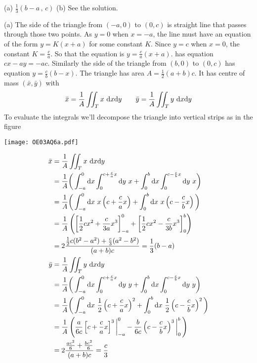 %

\begin{answer}
(a) $\frac{1}{3}(b-a\,,\,c)$\qquad
(b) See the solution.
\end{answer}

\begin{solution}
(a) The side of the triangle from $(-a,0)$ to $(0,c)$ is straight line that passes through those two points. As $y=0$ when $x=-a$, the line must have 
an equation of the form $y=K(x+a)$ for some constant $K$. Since $y=c$ when
$x=0$, the constant $K=\frac{c}{a}$. So that the equation is 
$y=\frac{c}{a}(x+a)$.
has equation $cx-ay=-ac$. Similarly the side of the triangle from 
$(b,0)$ to $(0,c)$ has equation $y=\frac{c}{b}(b-x)$. 
The triangle has area $A=\frac{1}{2}(a+b)c$. It has centre
of mass $(\bar x,\bar y)$ with
\begin{align*}
\bar x=\frac{1}{A}\iint_T x\ \mathrm{d}x\mathrm{d}y\qquad
\bar y=\frac{1}{A}\iint_T y\ \mathrm{d}x\mathrm{d}y
\end{align*}
To evaluate the integrals we'll decompose the triangle into vertical strips
as in the figure
\begin{center}
     \texttt{[image: OE03AQ6a.pdf]}
\end{center}
\begin{align*}
\bar x&=\frac{1}{A}\dblInt_T x\ \dee{x}\dee{y} \\
&=\frac{1}{A}\bigg(\int_{-a}^0 \dee{x}\int_0^{c+{c\over a}x}\dee{y}\ x
                   +\int_0^b \dee{x}\int_0^{c-{c\over b}x}\dee{y}\ x\bigg)\\
&=\frac{1}{A}\bigg(\int_{-a}^0 \dee{x}\ x\left(c+\frac{c}{a}x\right)
                   +\int_0^b \dee{x}\ x\left(c-\frac{c}{b}x\right)\bigg)\\
&=\frac{1}{A}\left(\left[\frac{1}{2} cx^2+\frac{c}{3a}x^3\right]_{-a}^0 
                   +\left[\frac{1}{2} cx^2-\frac{c}{3b}x^3\right]_0^b\right) \\
&=2\frac{\frac{1}{2} c(b^2-a^2)+\frac{c}{3}(a^2-b^2)}{(a+b)c}
=\frac{1}{3}(b-a)\\
\bar y&=\frac{1}{A}\dblInt_T y\ \dee{x}\dee{y} \\
&=\frac{1}{A}\bigg(\int_{-a}^0 \dee{x}\int_0^{c+{c\over a}x}\dee{y}\ y
                   +\int_0^b \dee{x}\int_0^{c-{c\over b}x}\dee{y}\ y\bigg)\\
&=\frac{1}{A}\bigg(\int_{-a}^0 \dee{x}\ \frac{1}{2}\left(c+\frac{c}{a}x\right)^2
                   +\int_0^b \dee{x}\ \frac{1}{2}\left(c-\frac{c}{b}x\right)^2\bigg)\\
&=\frac{1}{A}\left(\frac{a}{6c}\left[c+\frac{c}{a}x\right]^3\bigg|_{-a}^0 
                   -\frac{b}{6c}\left(c-\frac{c}{b}x\right)^3\bigg|_0^b\,
               \right) \\
&=2\frac{\frac{ac^2}{6}+\frac{bc^2}{6}}{(a+b)c}
=\frac{c}{3}
\end{align*}


\end{solution}
